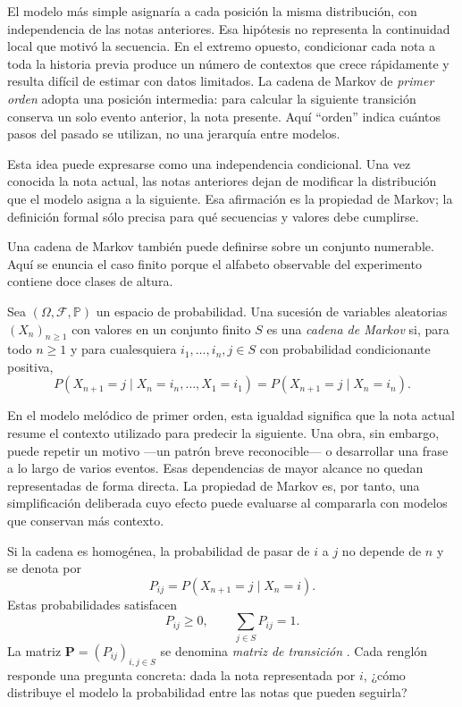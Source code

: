 El modelo más simple asignaría a cada posición la misma distribución, con independencia de las notas anteriores. Esa hipótesis no representa la continuidad local que motivó la secuencia. En el extremo opuesto, condicionar cada nota a toda la historia previa produce un número de contextos que crece rápidamente y resulta difícil de estimar con datos limitados. La cadena de Markov de \emph{primer orden} adopta una posición intermedia: para calcular la siguiente transición conserva un solo evento anterior, la nota presente. Aquí ``orden'' indica cuántos pasos del pasado se utilizan, no una jerarquía entre modelos.

Esta idea puede expresarse como una independencia condicional. Una vez conocida la nota actual, las notas anteriores dejan de modificar la distribución que el modelo asigna a la siguiente. Esa afirmación es la propiedad de Markov; la definición formal sólo precisa para qué secuencias y valores debe cumplirse.

Una cadena de Markov también puede definirse sobre un conjunto numerable. Aquí se enuncia el caso finito porque el alfabeto observable del experimento contiene doce clases de altura.

\begin{Definicion}
Sea $(\Omega,\mathcal{F},\mathbb{P})$ un espacio de probabilidad. Una sucesión de variables aleatorias $(X_n)_{n\geq 1}$ con valores en un conjunto finito $S$ es una \emph{cadena de Markov} si, para todo $n\geq 1$ y para cualesquiera $i_1,\ldots,i_n,j\in S$ con probabilidad condicionante positiva,
\[
P(X_{n+1}=j\mid X_n=i_n,\ldots,X_1=i_1)
=
P(X_{n+1}=j\mid X_n=i_n).
\]
\end{Definicion}

En el modelo melódico de primer orden, esta igualdad significa que la nota actual resume el contexto utilizado para predecir la siguiente. Una obra, sin embargo, puede repetir un motivo ---un patrón breve reconocible--- o desarrollar una frase a lo largo de varios eventos. Esas dependencias de mayor alcance no quedan representadas de forma directa. La propiedad de Markov es, por tanto, una simplificación deliberada cuyo efecto puede evaluarse al compararla con modelos que conservan más contexto.

Si la cadena es homogénea, la probabilidad de pasar de $i$ a $j$ no depende de $n$ y se denota por
\[
P_{ij}=P(X_{n+1}=j\mid X_n=i).
\]
Estas probabilidades satisfacen
\[
P_{ij}\geq 0,
\qquad
\sum_{j\in S}P_{ij}=1.
\]
La matriz $\mathbf{P}=(P_{ij})_{i,j\in S}$ se denomina \emph{matriz de transición} \cite{ross2014}. Cada renglón responde una pregunta concreta: dada la nota representada por $i$, ¿cómo distribuye el modelo la probabilidad entre las notas que pueden seguirla?

